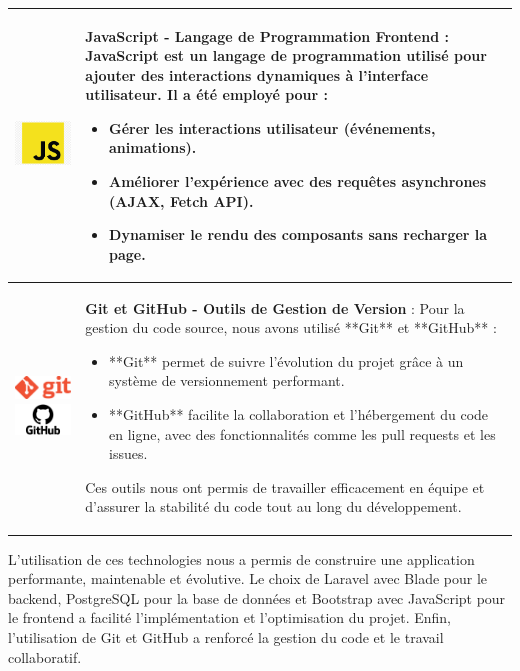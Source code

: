 \begin{longtable}{|m{4cm}|m{10cm}|}
    \includegraphics[width=3cm]{images/logo/javascript.png} & 
    \textbf{JavaScript - Langage de Programmation Frontend} : JavaScript est un langage de programmation utilisé pour ajouter des interactions dynamiques à l'interface utilisateur. Il a été employé pour :  
    \begin{itemize}
        \item Gérer les interactions utilisateur (événements, animations).
        \item Améliorer l'expérience avec des requêtes asynchrones (AJAX, Fetch API).
        \item Dynamiser le rendu des composants sans recharger la page.
    \end{itemize}\\
    \hline

    \includegraphics[width=3cm]{images/logo/git.png}  
    \includegraphics[width=3cm]{images/logo/github.png} & 
    \textbf{Git et GitHub - Outils de Gestion de Version} : Pour la gestion du code source, nous avons utilisé **Git** et **GitHub** :  
    \begin{itemize}
        \item **Git** permet de suivre l'évolution du projet grâce à un système de versionnement performant.
        \item **GitHub** facilite la collaboration et l’hébergement du code en ligne, avec des fonctionnalités comme les pull requests et les issues.
    \end{itemize}
    Ces outils nous ont permis de travailler efficacement en équipe et d’assurer la stabilité du code tout au long du développement.\\
    \hline

\end{longtable}
\begin{center}  
    \label{tab:table_techs_realisation} %
\end{center}  
L’utilisation de ces technologies nous a permis de construire une application performante, maintenable et évolutive. Le choix de Laravel avec Blade pour le backend, PostgreSQL pour la base de données et Bootstrap avec JavaScript pour le frontend a facilité l’implémentation et l’optimisation du projet. Enfin, l’utilisation de Git et GitHub a renforcé la gestion du code et le travail collaboratif.

